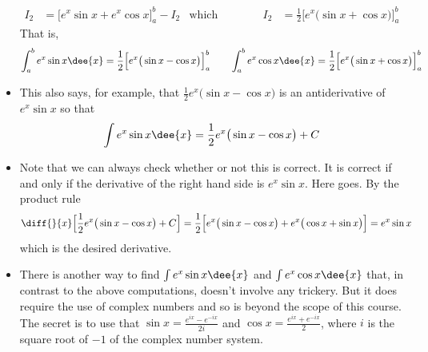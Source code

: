 \begin{eg}
\begin{itemize}
\begin{align*}
I_2 &=\Big[e^x\sin x +e^x\cos x\Big]_a^b -I_2
& \text{which implies}&&
I_2&=\frac{1}{2}\Big[e^x\big(\sin x+\cos x\big)\Big]_a^b
\end{align*}
That is,
\begin{align*}
\int_a^b e^x\sin x\dee{x}=
\frac{1}{2}\Big[e^x\big(\sin x-\cos x\big)\Big]_a^b
\qquad
\int_a^b e^x\cos x\dee{x}=
\frac{1}{2}\Big[e^x\big(\sin x+\cos x\big)\Big]_a^b
\end{align*}
\item This also says, for example,
that $\frac{1}{2}e^x\big(\sin x-\cos x\big)$ is an antiderivative
of $e^x\sin x$ so that
\begin{align*}
\int e^x\sin x\dee{x}=\frac{1}{2}e^x\big(\sin x-\cos x\big)+C
\end{align*}
\item Note that we can always check whether or not this is correct. It is
correct if and only if the derivative of the right hand side is $e^x\sin x$.
Here goes. By the product rule
\begin{align*}
\diff{}{x}\Big[\frac{1}{2}e^x\big(\sin x-\cos x\big)+C\Big]
&=\frac{1}{2}\Big[e^x\big(\sin x-\cos x\big)+e^x\big(\cos x+\sin x\big)\Big]
=e^x\sin x
\end{align*}
which is the desired derivative.

\item There is another way to find $\int e^x\sin x\dee{x}$ and
$\int e^x\cos x\dee{x}$ that, in contrast to the above computations,
doesn't involve any trickery. But it does require the use of complex
numbers and so is beyond the scope of this course.
The secret is to use that $\sin x =\frac{e^{ix}-e^{-ix}}{2i}$
and $\cos x =\frac{e^{ix}+e^{-ix}}{2}$, where $i$ is the square root of
$-1$ of the complex number system.

\end{itemize}

\end{eg}

